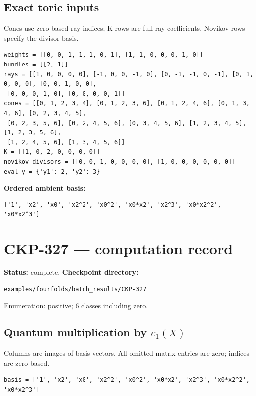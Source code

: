 \documentclass[10pt,a4paper]{article}
\begin{document}
\subsection*{Exact toric inputs}
Cones use zero-based ray indices; K rows are full ray coefficients. Novikov rows specify the divisor basis.

\begin{lstlisting}
weights = [[0, 0, 1, 1, 1, 0, 1], [1, 1, 0, 0, 0, 1, 0]]
bundles = [[2, 1]]
rays = [[1, 0, 0, 0, 0], [-1, 0, 0, -1, 0], [0, -1, -1, 0, -1], [0, 1, 0, 0, 0], [0, 0, 1, 0, 0],
 [0, 0, 0, 1, 0], [0, 0, 0, 0, 1]]
cones = [[0, 1, 2, 3, 4], [0, 1, 2, 3, 6], [0, 1, 2, 4, 6], [0, 1, 3, 4, 6], [0, 2, 3, 4, 5],
 [0, 2, 3, 5, 6], [0, 2, 4, 5, 6], [0, 3, 4, 5, 6], [1, 2, 3, 4, 5], [1, 2, 3, 5, 6],
 [1, 2, 4, 5, 6], [1, 3, 4, 5, 6]]
K = [[1, 0, 2, 0, 0, 0, 0]]
novikov_divisors = [[0, 0, 1, 0, 0, 0, 0], [1, 0, 0, 0, 0, 0, 0]]
eval_y = {'y1': 2, 'y2': 3}
\end{lstlisting}

\textbf{Ordered ambient basis:}
\begin{lstlisting}
['1', 'x2', 'x0', 'x2^2', 'x0^2', 'x0*x2', 'x2^3', 'x0*x2^2', 'x0*x2^3']
\end{lstlisting}

\clearpage\section*{CKP-327 --- computation record}
\textbf{Status:} complete.
\textbf{Checkpoint directory:}
\begin{lstlisting}
examples/fourfolds/batch_results/CKP-327
\end{lstlisting}

Enumeration: positive; 6 classes including zero.
\subsection*{Quantum multiplication by $c_1(X)$}
Columns are images of basis vectors. All omitted matrix entries are zero; indices are zero based.

\begin{lstlisting}
basis = ['1', 'x2', 'x0', 'x2^2', 'x0^2', 'x0*x2', 'x2^3', 'x0*x2^2', 'x0*x2^3']
\end{lstlisting}
\end{document}
